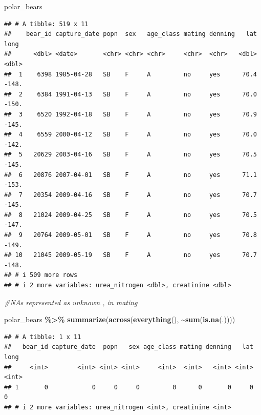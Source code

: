 \documentclass[
]{article}
\newenvironment{Shaded}{\begin{snugshade}}{\end{snugshade}}
\newcommand{\CommentTok}[1]{\textcolor[rgb]{0.56,0.35,0.01}{\textit{#1}}}
\newcommand{\FunctionTok}[1]{\textcolor[rgb]{0.13,0.29,0.53}{\textbf{#1}}}
\newcommand{\NormalTok}[1]{#1}
\newcommand{\SpecialCharTok}[1]{\textcolor[rgb]{0.81,0.36,0.00}{\textbf{#1}}}
\begin{document}
\begin{Shaded}
\begin{Highlighting}[]
\NormalTok{polar\_bears}
\end{Highlighting}
\end{Shaded}

\begin{verbatim}
## # A tibble: 519 x 11
##    bear_id capture_date popn  sex   age_class mating denning   lat  long
##      <dbl> <date>       <chr> <chr> <chr>     <chr>  <chr>   <dbl> <dbl>
##  1    6398 1985-04-28   SB    F     A         no     yes      70.4 -148.
##  2    6384 1991-04-13   SB    F     A         no     yes      70.0 -150.
##  3    6520 1992-04-18   SB    F     A         no     yes      70.9 -145.
##  4    6559 2000-04-12   SB    F     A         no     yes      70.0 -142.
##  5   20629 2003-04-16   SB    F     A         no     yes      70.5 -145.
##  6   20876 2007-04-01   SB    F     A         no     yes      71.1 -153.
##  7   20354 2009-04-16   SB    F     A         no     yes      70.7 -145.
##  8   21024 2009-04-25   SB    F     A         no     yes      70.5 -147.
##  9   20764 2009-05-01   SB    F     A         no     yes      70.8 -149.
## 10   21045 2009-05-19   SB    F     A         no     yes      70.7 -148.
## # i 509 more rows
## # i 2 more variables: urea_nitrogen <dbl>, creatinine <dbl>
\end{verbatim}

\begin{Shaded}
\begin{Highlighting}[]
\CommentTok{\#NAs represented as unknown , in mating}
\end{Highlighting}
\end{Shaded}

\begin{Shaded}
\begin{Highlighting}[]
\NormalTok{polar\_bears }\SpecialCharTok{\%\textgreater{}\%}
  \FunctionTok{summarize}\NormalTok{(}\FunctionTok{across}\NormalTok{(}\FunctionTok{everything}\NormalTok{(), }\SpecialCharTok{\textasciitilde{}}\FunctionTok{sum}\NormalTok{(}\FunctionTok{is.na}\NormalTok{(.))))}
\end{Highlighting}
\end{Shaded}

\begin{verbatim}
## # A tibble: 1 x 11
##   bear_id capture_date  popn   sex age_class mating denning   lat  long
##     <int>        <int> <int> <int>     <int>  <int>   <int> <int> <int>
## 1       0            0     0     0         0      0       0     0     0
## # i 2 more variables: urea_nitrogen <int>, creatinine <int>
\end{verbatim}
\end{document}
